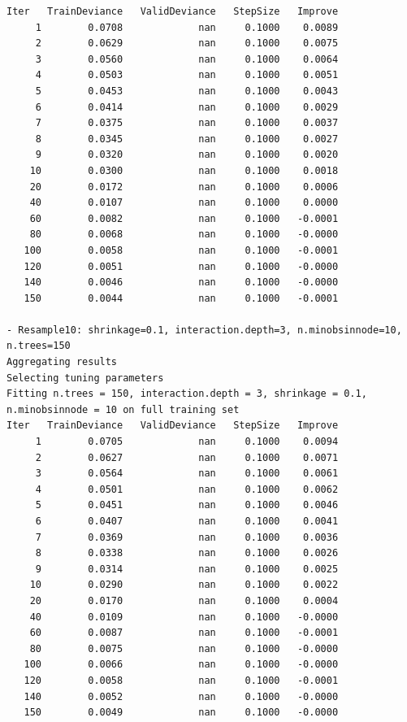 \documentclass[
  letterpaper,
  DIV=11,
  numbers=noendperiod]{scrartcl}
\begin{document}
\begin{verbatim}
Iter   TrainDeviance   ValidDeviance   StepSize   Improve
     1        0.0708             nan     0.1000    0.0089
     2        0.0629             nan     0.1000    0.0075
     3        0.0560             nan     0.1000    0.0064
     4        0.0503             nan     0.1000    0.0051
     5        0.0453             nan     0.1000    0.0043
     6        0.0414             nan     0.1000    0.0029
     7        0.0375             nan     0.1000    0.0037
     8        0.0345             nan     0.1000    0.0027
     9        0.0320             nan     0.1000    0.0020
    10        0.0300             nan     0.1000    0.0018
    20        0.0172             nan     0.1000    0.0006
    40        0.0107             nan     0.1000    0.0000
    60        0.0082             nan     0.1000   -0.0001
    80        0.0068             nan     0.1000   -0.0000
   100        0.0058             nan     0.1000   -0.0001
   120        0.0051             nan     0.1000   -0.0000
   140        0.0046             nan     0.1000   -0.0000
   150        0.0044             nan     0.1000   -0.0001

- Resample10: shrinkage=0.1, interaction.depth=3, n.minobsinnode=10, n.trees=150 
Aggregating results
Selecting tuning parameters
Fitting n.trees = 150, interaction.depth = 3, shrinkage = 0.1, n.minobsinnode = 10 on full training set
Iter   TrainDeviance   ValidDeviance   StepSize   Improve
     1        0.0705             nan     0.1000    0.0094
     2        0.0627             nan     0.1000    0.0071
     3        0.0564             nan     0.1000    0.0061
     4        0.0501             nan     0.1000    0.0062
     5        0.0451             nan     0.1000    0.0046
     6        0.0407             nan     0.1000    0.0041
     7        0.0369             nan     0.1000    0.0036
     8        0.0338             nan     0.1000    0.0026
     9        0.0314             nan     0.1000    0.0025
    10        0.0290             nan     0.1000    0.0022
    20        0.0170             nan     0.1000    0.0004
    40        0.0109             nan     0.1000   -0.0000
    60        0.0087             nan     0.1000   -0.0001
    80        0.0075             nan     0.1000   -0.0000
   100        0.0066             nan     0.1000   -0.0000
   120        0.0058             nan     0.1000   -0.0001
   140        0.0052             nan     0.1000   -0.0000
   150        0.0049             nan     0.1000   -0.0000


\end{verbatim}
\end{document}
